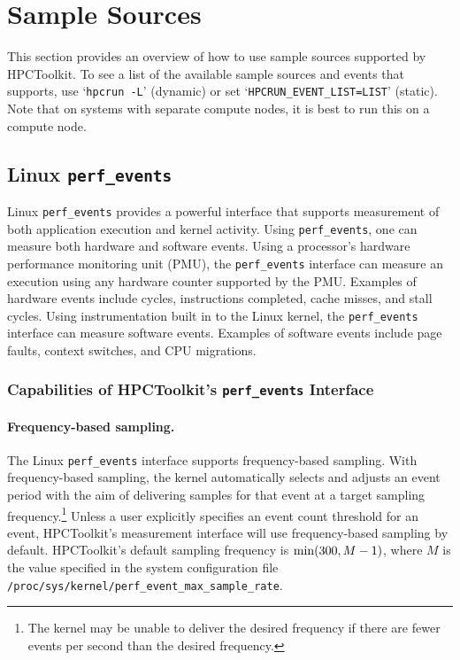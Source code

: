 
\section{Sample Sources}
\label{sample-sources}

This section provides an overview of how to use sample sources supported by HPCToolkit.  To
see a list of the available sample sources and events that \hpcrun{}
supports, use `\verb|hpcrun -L|' (dynamic) or set
`\verb|HPCRUN_EVENT_LIST=LIST|' (static).  Note that on systems with
separate compute nodes, it is best to run this on a compute node.

\newcommand{\perfevents}{{\tt perf\_events}}

\subsection{Linux \perfevents}

Linux \perfevents{} provides a powerful interface that supports 
measurement of both application execution and kernel activity. 
Using
\perfevents{}, one can measure both hardware and software events. 
Using a processor's hardware performance monitoring unit (PMU), the
\perfevents{} interface can measure an execution using any hardware counter
supported by the PMU. Examples of hardware events include cycles, instructions
completed, cache misses, and stall cycles. Using instrumentation built in to the Linux kernel,
the \perfevents{} interface can measure software events. Examples of software events include page
faults, context switches, and CPU migrations. 



\subsubsection{Capabilities of HPCToolkit's \perfevents{} Interface}

\paragraph{Frequency-based sampling.} 
The Linux \perfevents{} interface supports frequency-based sampling. 
With frequency-based sampling, the kernel automatically selects and adjusts an event period with the
aim of delivering samples for that event at a target sampling frequency.\footnote{The 
kernel may be unable to deliver the desired frequency if 
there are fewer events per second than the desired frequency.}  
Unless a user explicitly specifies an event count threshold for an event, 
HPCToolkit's measurement interface will use frequency-based sampling by default.  
HPCToolkit's default sampling frequency is ${\rm min}(300,M-1)$, where $M$ is the 
value specified in the system configuration file \verb|/proc/sys/kernel/perf_event_max_sample_rate|.

